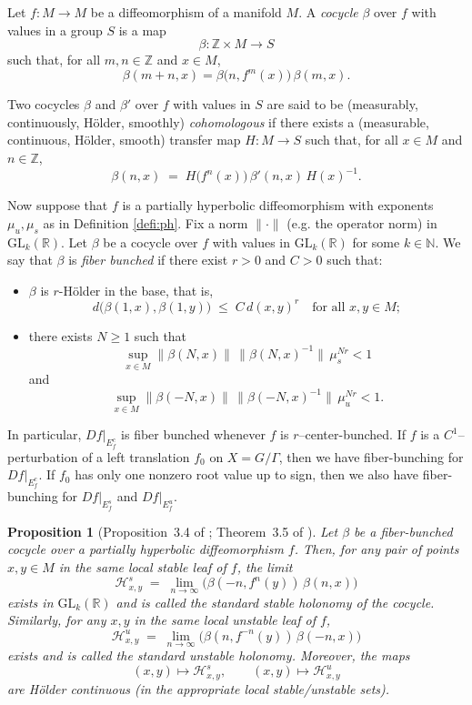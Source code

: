 \documentclass[11pt]{amsart}
\numberwithin{equation}{section}
\theoremstyle{plain}
\newtheorem{prop}[thm]{Proposition}
\begin{document}
Let $f \colon M \to M$ be a diffeomorphism of a manifold $M$. A \emph{cocycle} $\beta$ over $f$ with values in a group $S$ is a map
\[
\beta \colon \mathbb{Z} \times M \to S
\]
such that, for all $m,n \in \mathbb{Z}$ and $x \in M$,
\[
\beta(m+n,x) = \beta\bigl(n, f^m(x)\bigr)\,\beta(m,x).
\]

Two cocycles $\beta$ and $\beta'$ over $f$ with values in $S$ are said to be (measurably, continuously, H\"older, smoothly) \emph{cohomologous} if there exists a (measurable, continuous, H\"older, smooth) transfer map $H \colon M \to S$ such that, for all $x \in M$ and $n \in \mathbb{Z}$,
\[
\beta(n,x) \;=\; H\bigl(f^n(x)\bigr)\,\beta'(n,x)\,H(x)^{-1}.
\]

Now suppose that $f$ is a partially hyperbolic diffeomorphism with exponents $\mu_u,\mu_s$ as in Definition \ref{defi:ph}. Fix a norm $\|\cdot\|$ (e.g. the operator norm) in $\mathrm{GL}_k(\mathbb{R})$. Let $\beta$ be a cocycle over $f$ with values in $\mathrm{GL}_k(\mathbb{R})$ for some $k \in \mathbb{N}$. We say that $\beta$ is \emph{fiber bunched} if there exist $r>0$ and $C>0$ such that:

\begin{itemize}
  \item[(1)] $\beta$ is $r$-H\"older in the base, that is,
  \[
  d\bigl(\beta(1,x),\beta(1,y)\bigr)\;\le\; C\,d(x,y)^r
  \quad\text{for all } x,y \in M;
  \]
  \item[(2)] there exists
$N\ge 1$ such that
\[
\sup_{x\in M}\|\beta(N,x)\|\,\|\beta(N,x)^{-1}\|\,\mu_s^{Nr}<1
\]
and
\[
\sup_{x\in M}\|\beta(-N,x)\|\,\|\beta(-N,x)^{-1}\|\,\mu_u^{Nr}<1.
\]
\end{itemize}

In particular, $Df|_{E^c_f}$ is fiber bunched whenever $f$ is $r$--center-bunched. If $f$ is a $C^1$--perturbation of a left translation $f_0$ on $X = G/\Gamma$, then we have fiber-bunching for $Df|_{E^{c}_f}$. If $f_0$ has only one  nonzero root value up to sign, then we also have fiber-bunching for $Df|_{E^{s}_f}$ and $Df|_{E^{u}_f}$.

\begin{prop}[Proposition~3.4 of \cite{ASV}; Theorem~3.5 of \cite{KalSad}]\label{prop:holcocycle}
Let $\beta$ be a fiber-bunched cocycle over a partially hyperbolic diffeomorphism $f$. Then, for any pair of points $x,y \in M$ in the same local stable leaf of $f$, the limit
\[
\mathcal{H}_{x,y}^s
\;=\;
\lim_{n \to \infty}
\bigl(
  \beta(-n, f^{n}(y)) \,\beta(n, x)
\bigr)
\]
exists in $\mathrm{GL}_k(\mathbb{R})$ and is called the \emph{standard stable holonomy} of the cocycle. Similarly, for any $x,y$ in the same local unstable leaf of $f$,
\[
\mathcal{H}_{x,y}^u
\;=\;
\lim_{n \to \infty}
\bigl(
  \beta(n, f^{-n}(y)) \,\beta(-n, x)
\bigr)
\]
exists and is called the \emph{standard unstable holonomy}. Moreover, the maps
\[
(x,y) \mapsto \mathcal{H}_{x,y}^s, \qquad (x,y) \mapsto \mathcal{H}_{x,y}^u
\]
are H\"older continuous (in the appropriate local stable/unstable sets).
\end{prop}
\end{document}

